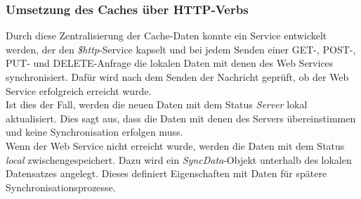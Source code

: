 {\subsubsection*{Umsetzung des Caches über HTTP-Verbs}
\label{sssec:Http-Verbs}
Durch diese Zentralisierung der Cache-Daten konnte ein Service entwickelt werden, der den \textit{\$http}-Service kapselt und bei jedem Senden einer GET-, POST-, PUT- und DELETE-Anfrage die lokalen Daten mit denen des Web Services synchronisiert. Dafür wird nach dem Senden der Nachricht geprüft, ob der Web Service erfolgreich erreicht wurde.\\
Ist dies der Fall, werden die neuen Daten mit dem Status \textit{Server} lokal aktualisiert. Dies sagt aus, dass die Daten mit denen des Servers übereinstimmen und keine Synchronisation erfolgen muss.\\
Wenn der Web Service nicht erreicht wurde, werden die Daten mit dem Status \textit{local} zwischengespeichert. Dazu wird ein \textit{SyncData}-Objekt unterhalb des lokalen Datensatzes angelegt. Dieses definiert Eigenschaften mit Daten für spätere Synchronisationsprozesse.

}
